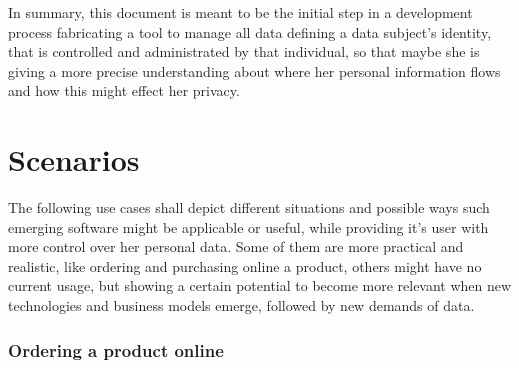 \documentclass[12pt,english,a4paper,titlepage,cleardoublepage=empty,dottedtoc]{report}
\begin{document}
In summary, this document is meant to be the initial step in a
development process fabricating a tool to manage all data defining a
data subject's identity, that is controlled and administrated by that
individual, so that maybe she is giving a more precise understanding
about where her personal information flows and how this might effect her
privacy.

\hypertarget{scenarios}{\section{Scenarios}\label{scenarios}}

The following use cases shall depict different situations and possible
ways such emerging software might be applicable or useful, while
providing it's user with more control over her personal data. Some of
them are more practical and realistic, like ordering and purchasing
online a product, others might have no current usage, but showing a
certain potential to become more relevant when new technologies and
business models emerge, followed by new demands of data.

\subsubsection{Ordering a product
online}\label{ordering-a-product-online}
\end{document}
